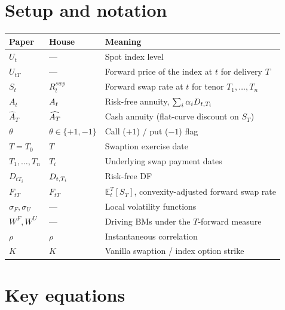 \documentclass[11pt,a4paper]{article}
\begin{document}
\section{Setup and notation}

\begin{tabular}{@{}p{3cm}p{3.5cm}p{8.5cm}@{}}
\toprule
Paper                   & House                       & Meaning \\
\midrule
$U_t$                   & ---                         & Spot index level \\
$U_{tT}$                & ---                         & Forward price of the index at $t$ for delivery $T$ \\
$S_t$                   & $R^{swp}_t$                 & Forward swap rate at $t$ for tenor $T_1, \ldots, T_n$ \\
$A_t$                   & $A_{t}$                   & Risk-free annuity, $\sum_i \alpha_i D_{t,T_i}$ \\
$\widehat A_T$          & $\widehat{A_{T}}$         & Cash annuity (flat-curve discount on $S_T$) \\
$\theta$                & $\theta \in \{+1, -1\}$     & Call ($+1$) / put ($-1$) flag \\
$T = T_0$               & $T$                         & Swaption exercise date \\
$T_1, \ldots, T_n$      & $T_i$                       & Underlying swap payment dates \\
$D_{tT_i}$              & $D_{t,T_i}$             & Risk-free DF \\
$F_{tT}$                & $F_{tT}$                    & $\mathbb{E}^T_t[S_T]$, convexity-adjusted forward swap rate \\
$\sigma_F, \sigma_U$    & ---                         & Local volatility functions \\
$W^F, W^U$              & ---                         & Driving BMs under the $T$-forward measure \\
$\rho$                  & $\rho$                      & Instantaneous correlation \\
$K$                     & $K$                         & Vanilla swaption / index option strike \\
\bottomrule
\end{tabular}

\section{Key equations}
\end{document}

